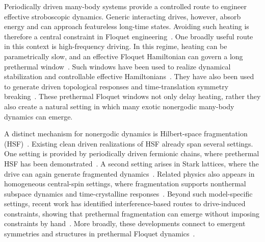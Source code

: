\documentclass[aps,prb,reprint,twocolumn,amsmath,amssymb,citeautoscript]{revtex4-2}
\begin{document}
Periodically driven many-body systems provide a controlled route to engineer effective stroboscopic dynamics. Generic interacting drives, however, absorb energy and can approach featureless long-time states. Avoiding such heating is therefore a central constraint in Floquet engineering~\cite{DAlessioPolkovnikov2013AnnPhys,DAlessioKafriPolkovnikovRigol2016AdvPhys}. One broadly useful route in this context is high-frequency driving. In this regime, heating can be parametrically slow, and an effective Floquet Hamiltonian can govern a long prethermal window~\cite{Abanin2015PRL,Abanin2017PRB,Kuwahara2016AnnPhys,Mori2016PRL,HoMoriAbaninDallaTorre2023AnnPhys}. Such windows have been used to realize dynamical stabilization and controllable effective Hamiltonians~\cite{Eckardt2017RMP,OkaKitamura2019ARCMP}. They have also been used to generate driven topological responses and time-translation symmetry breaking~\cite{ElseNayak2016PRB,VonKeyserlingkSondhi2016PRB1,PotterMorimotoVishwanath2016PRX,ElseBauerNayak2016PRLTimeCrystals,HarperRoyRudnerSondhi2020ARCMP,ElseBauerNayak2017PRX}. These prethermal Floquet windows not only delay heating, rather they also create a natural setting in which many exotic nonergodic many-body dynamics can emerge.

A distinct mechanism for nonergodic dynamics is Hilbert-space fragmentation (HSF)~\cite{Sala2020PRX,Khemani2020PRBShattering,MoudgalyaMotrunich2022PRX,MoudgalyaBernevigRegnault2022RPP,Mukherjee2021PRBMinimalHSF,AdityaDharSen2024PRB}. Existing clean driven realizations of HSF already span several settings. One setting is provided by periodically driven fermionic chains, where prethermal HSF has been demonstrated~\cite{Ghosh2023PRL,Ghosh2024PRB}. A second setting arises in Stark lattices, where the drive can again generate fragmented dynamics~\cite{Zhang2024StarkHSF}. Related physics also appears in homogeneous central-spin settings, where fragmentation supports nonthermal subspace dynamics and time-crystalline responses~\cite{Kumar2025CentralSpinHSF,Tang2025DTCviaHSF}. Beyond such model-specific settings, recent work has identified interference-based routes to drive-induced constraints, showing that prethermal fragmentation can emerge without imposing constraints by hand~\cite{GhoshPaulSengupta2025Spin}. More broadly, these developments connect to emergent symmetries and structures in prethermal Floquet dynamics~\cite{BanerjeeSengupta2025JPCM}.
\end{document}
